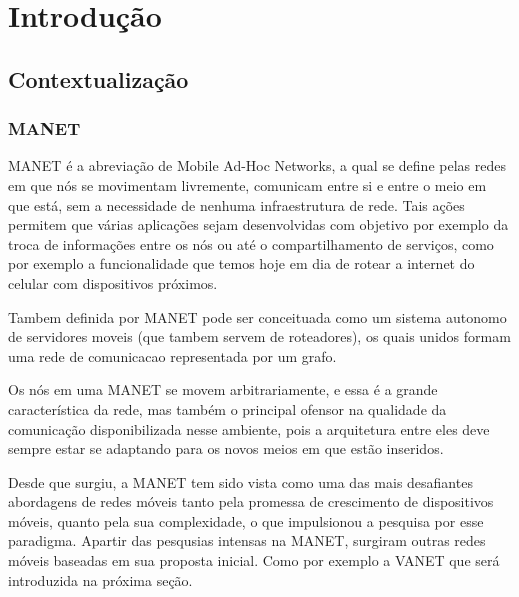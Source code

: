 \documentclass[12pt, %
openright, 
oneside,
a4paper,
brazil]{facom-ufu-abntex2}
\begin{document}
\tableofcontents*
\cleardoublepage





\textual



\chapter{Introdução}
\section{Contextualização}
\subsection{MANET}
MANET é a abreviação de Mobile Ad-Hoc Networks, a qual se define pelas redes em que nós se movimentam livremente, comunicam entre si e entre o meio em que está, sem a necessidade de nenhuma infraestrutura de rede. Tais ações permitem que várias aplicações sejam desenvolvidas com objetivo por exemplo da troca de informações entre os nós ou até o compartilhamento de serviços, como por exemplo a funcionalidade que temos hoje em dia de rotear a internet do celular com dispositivos próximos.

Tambem definida por MANET pode ser conceituada como um sistema autonomo de servidores moveis (que tambem servem de roteadores), os quais unidos formam uma rede de comunicacao representada por um grafo.

Os nós em uma MANET se movem arbitrariamente, e essa é a grande característica da rede, mas também o principal ofensor na qualidade da comunicação disponibilizada nesse ambiente, pois a arquitetura entre eles deve sempre estar se adaptando para os novos meios em que estão inseridos.

Desde que surgiu, a MANET tem sido vista como uma das mais desafiantes abordagens de redes móveis tanto pela promessa de crescimento de dispositivos móveis, quanto pela sua complexidade, o que impulsionou a pesquisa por esse paradigma. Apartir das pesqusias intensas na MANET, surgiram outras redes móveis baseadas em sua proposta inicial. Como por exemplo a VANET que será introduzida na próxima seção.
\end{document}
